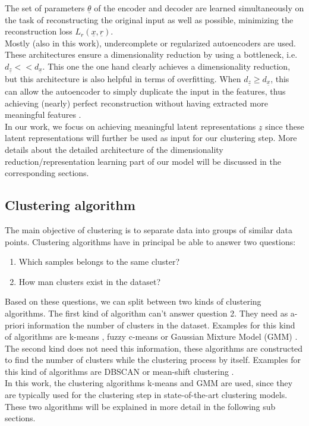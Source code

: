 \documentclass[12pt,DIV14,BCOR12mm,a4paper,footexclude,headinclude,halfparskip-,twoside,openright,openany,cleardoubleempty,idxtotoc,bibtotoc]{scrreprt} %
\numberwithin{equation}{chapter}
\begin{document}
The set of parameters $\underline{\theta}$ of the encoder and decoder are learned simultaneously on the task of reconstructing the original input as well as possible, minimizing the reconstruction loss $L_{r}(\underline{x},\underline{r})$.\\
Mostly (also in this work), undercomplete or regularized autoencoders are used. These architectures ensure a dimensionality reduction by using a bottleneck, i.e. $d_{\underline{z}} << d_{\underline{x}}$. This one the one hand clearly achieves a dimensionality reduction, but this architecture is also helpful in terms of overfitting. When $d_{\underline{z}} \geq d_{\underline{x}}$, this can allow the autoencoder to simply duplicate the input in the features, thus achieving (nearly) perfect reconstruction without having extracted more meaningful features \cite{Bengio-et-al-2013}.\\
In our work, we focus on achieving meaningful latent representations $\underline{z}$ since these latent representations will further be used as input for our clustering step. More details about the detailed architecture of the dimensionality reduction/representation learning part of our model will be discussed in the corresponding sections.
\subsection{Clustering algorithm}
The main objective of clustering is to separate data into groups of similar data points. Clustering algorithms have in principal be able to answer two questions:
\begin{enumerate}
	\item Which samples belongs to the same cluster?
	\item How man clusters exist in the dataset?
\end{enumerate}
Based on these questions, we can split between two kinds of clustering algorithms. The first kind of algorithm can't answer question 2. They need as a-priori information the number of clusters in the dataset. Examples for this kind of algorithms are k-means \cite{Lloyd82leastsquares}, fuzzy c-means \cite{Bezdek81fuzzycmenas} or Gaussian Mixture Model (GMM) \cite{Gilles07MixtureModelsforClassification}.\\
The second kind does not need this information, these algorithms are constructed to find the number of clusters while the clustering process by itself. Examples for this kind of algorithms are DBSCAN \cite{Ester96adensity-based} or mean-shift clustering \cite{Fukunaga75mean-shift}.\\
In this work, the clustering algorithms k-means and GMM are used, since they are typically used for the clustering step in state-of-the-art clustering models. These two algorithms will be explained in more detail in the following sub sections.
\end{document}
